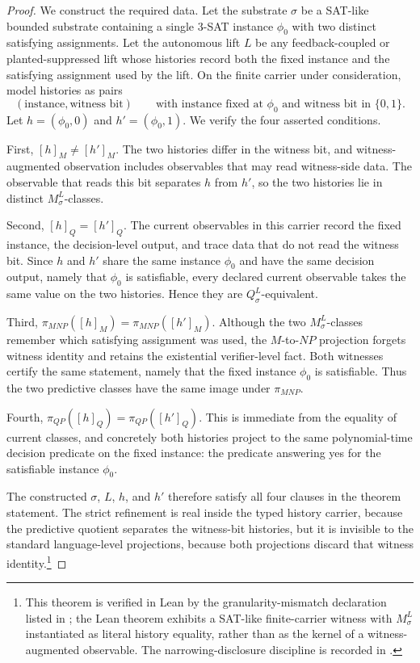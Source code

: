 \documentclass[11pt]{article}
\newcommand{\Substrate}{\sigma}             \newcommand{\Lift}{L}                       \newcommand{\LiftState}{\sigma_{L}}         \newcommand{\HistorySpace}{H_{\Substrate}^{\Lift}}
\newcommand{\Qquotient}{Q_{\Substrate}^{\Lift}}
\newcommand{\Mquotient}{M_{\Substrate}^{\Lift}}
\newcommand{\Qclass}[1]{[#1]_{Q}}
\newcommand{\Mclass}[1]{[#1]_{M}}
\newcommand{\PiQP}{\pi_{QP}}                \newcommand{\PiMNP}{\pi_{MNP}}
\theoremstyle{definition}
\begin{document}
\begin{proof}
We construct the required data.  Let the substrate \(\Substrate\) be a
SAT-like bounded substrate containing a single \(3\)-SAT instance
\(\phi_{0}\) with two distinct satisfying assignments.  Let the
autonomous lift \(\Lift\) be any feedback-coupled or
planted-suppressed lift whose histories record both the fixed instance
and the satisfying assignment used by the lift.  On the finite carrier
under consideration, model histories as pairs
\[
  (\text{instance},\text{witness bit})
  \qquad\text{with instance fixed at }\phi_{0}
  \text{ and witness bit in }\{0,1\}.
\]
Let \(h=(\phi_{0},0)\) and \(h'=(\phi_{0},1)\).  We verify the four
asserted conditions.

First, \(\Mclass{h}\neq\Mclass{h'}\).  The two histories differ in the
witness bit, and witness-augmented observation includes observables
that may read witness-side data.  The observable that reads this bit
separates \(h\) from \(h'\), so the two histories lie in distinct
\(\Mquotient\)-classes.

Second, \(\Qclass{h}=\Qclass{h'}\).  The current observables in this
carrier record the fixed instance, the decision-level output, and
trace data that do not read the witness bit.  Since \(h\) and \(h'\)
share the same instance \(\phi_{0}\) and have the same decision output,
namely that \(\phi_{0}\) is satisfiable, every declared current
observable takes the same value on the two histories.  Hence they are
\(\Qquotient\)-equivalent.

Third, \(\PiMNP(\Mclass{h})=\PiMNP(\Mclass{h'})\).  Although the two
\(\Mquotient\)-classes remember which satisfying assignment was used,
the \(M\)-to-\(NP\) projection forgets witness identity and retains the
existential verifier-level fact.  Both witnesses certify the same
statement, namely that the fixed instance \(\phi_{0}\) is satisfiable.
Thus the two predictive classes have the same image under \(\PiMNP\).

Fourth, \(\PiQP(\Qclass{h})=\PiQP(\Qclass{h'})\).  This is immediate
from the equality of current classes, and concretely both histories
project to the same polynomial-time decision predicate on the fixed
instance: the predicate answering yes for the satisfiable instance
\(\phi_{0}\).

The constructed \(\Substrate\), \(\Lift\), \(h\), and \(h'\) therefore
satisfy all four clauses in the theorem statement.  The strict
refinement is real inside the typed history carrier, because the
predictive quotient separates the witness-bit histories, but it is
invisible to the standard language-level projections, because both
projections discard that witness identity.\footnote{This theorem is
verified in Lean by the granularity-mismatch declaration listed in
; the Lean theorem exhibits a SAT-like
finite-carrier witness with \(\Mquotient\) instantiated as literal
history equality, rather than as the kernel of a witness-augmented
observable.  The narrowing-disclosure discipline is recorded in
.}
\end{proof}
\end{document}
